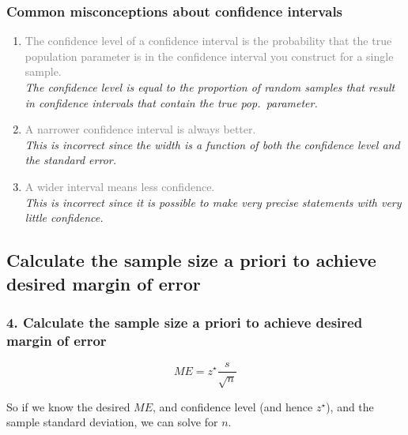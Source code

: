 \documentclass[11pt,containsverbatim,handout,xcolor=xelatex,dvipsnames,table]{beamer}
\begin{document}
\begin{frame}
\frametitle{Common misconceptions about confidence intervals}

\begin{enumerate}

\item \textcolor{gray}{The confidence level of a confidence interval is the
probability that the true population parameter is in the confidence
interval you construct for a single sample.} \\
\textit{The confidence level is equal to the proportion of random samples that result
in confidence intervals that contain the true pop.\ parameter.} \\

\pause

\item \textcolor{gray}{A narrower confidence interval is always better.}\\
\textit{This is incorrect since the width is a function of both the confidence level and 
the standard error.} \\

\pause

\item \textcolor{gray}{A wider interval means less confidence.} \\

\textit{This is incorrect since it is possible to make very precise statements with very 
little confidence.} \\

\end{enumerate}
 
\end{frame}


\subsection{Calculate the sample size a priori to achieve desired margin of error}
\label{mi4}


\begin{frame}
\frametitle{4. Calculate the sample size a priori to achieve desired margin of error}

\vfill

\[ ME = z^\star \frac{s}{\sqrt{n}} \]

So if we know the desired $ME$, and confidence level (and hence $z^\star$),
and the sample standard deviation, we can solve for $n$.

\vfill
 
\end{frame}
\end{document}
